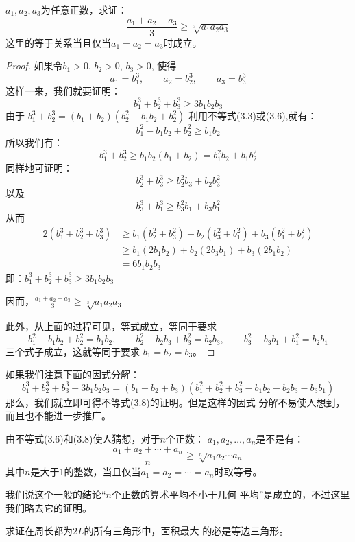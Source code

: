 \begin{example}
$a_1,a_2,a_3$为任意正数，求证：
\begin{equation}
 \frac{a_1+a_2+a_3}{3}\ge \sqrt[3]{a_1a_2a_3}  
\end{equation}
这里的等于关系当且仅当$a_1=a_2=a_3$时成立。
\end{example}

\begin{proof}
    如果令$b_1>0$, $b_2>0$, $b_3>0$, 使得
\[a_1=b_1^3,\qquad a_2=b_2^3,\qquad  a_3=b_3^3\]
这样一来，我们就要证明：
\[b_1^3+b_2^3+b_3^3\ge 3b_1b_2b_3\]
由于
$b_1^3+b_2^3=(b_1+b_2)(b_2^2-b_1b_2+b^2_2)$
利用不等式(3.3)或(3.6),就有：
\[b_1^2 -b_1b_2+b_2^2\ge b_1b_2\]
所以我们有：
\[b^3_1+b_2^3\ge b_1b_2(b_1+b_2)=b_1^2 b_2+b_1b_2^2\]
同样地可证明：
\[b_2^3+b_3^3\ge b_2^2b_3+b_2b^2_3\]
以及
\[b_3^3+b_1^3\ge b_3^2b_1+b_3b^2_1\]
从而
\[\begin{split}
    2(b_1^3+b_2^3+b_3^3) &\ge b_1(b^2_2+b^2_3)+b_2(b^2_3+b^2_1)+b_3(b^2_1+b^2_2)\\
    &\ge b_1(2b_1b_2)+b_2(2b_3b_1)+b_3(2b_1b_2)\\
    &=6b_1b_2b_3
\end{split}\]
即：$b_1^3+b_2^3+b_3^3\ge 3b_1b_2b_3$

因而，$\frac{a_1+a_2+a_3}{3}\ge \sqrt[3]{a_1a_2a_3}  $

此外，从上面的过程可见，等式成立，等同于要求
\[b_1^2-b_1b_2 +b_2^2=b_1b_2,\qquad  b_2^2 -b_2b_3+b_3^2 =b_2b_3,\qquad b_3^2-b_3b_1+b_1^2=b_2b_1\]
三个式子成立，这就等同于要求
$b_1=b_2=b_3$。
\end{proof}

\begin{rmk}
    如果我们注意下面的因式分解：
    \[b_1^3+b_2^3+b_3^3-3b_1b_2b_3=(b_1+b_2+b_3)(b_1^2+b_2^2
    +b^2_3-b_1b_2-b_2b_3-b_3b_1)\]
    那么，我们就立即可得不等式(3.8)的证明。但是这样的因式
    分解不易使人想到，而且也不能进一步推广。 
\end{rmk}

由不等式(3.6)和(3.8)使人猜想，对于$n$个正数：
$a_1,a_2,\ldots,a_n$是不是有：
\[\frac{a_1+a_2+\cdots+a_n}{n}\ge \sqrt[n]{a_1a_2\cdots a_n}\]
其中$n$是大于1的整数，当且仅当$a_1=a_2=\cdots=a_n$时取等号。

我们说这个一般的结论“$n$个正数的算术平均不小于几何
平均”是成立的，不过这里我们略去它的证明。

\begin{example}
    求证在周长都为$2L$的所有三角形中，面积最大
的必是等边三角形。
\end{example}

